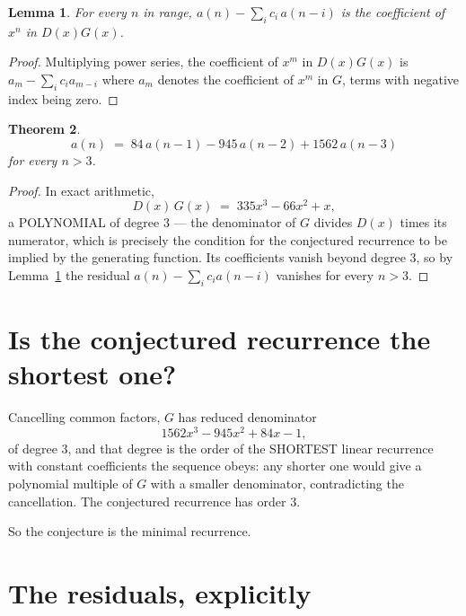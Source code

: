 \documentclass[11pt,a4paper]{article}
\theoremstyle{plain}
\newtheorem{theorem}{Theorem}
\newtheorem{lemma}[theorem]{Lemma}
\theoremstyle{definition}
\begin{document}
\begin{lemma}\label{lem:key}
For every $n$ in range, $a(n)-\sum_i c_i\,a(n-i)$ is the coefficient of $x^{n}$ in
$D(x)G(x)$.
\end{lemma}

\begin{proof}
Multiplying power series, the coefficient of $x^{m}$ in $D(x)G(x)$ is
$a_m-\sum_i c_i a_{m-i}$ where $a_m$ denotes the coefficient of $x^{m}$ in $G$, terms with
negative index being zero.
\end{proof}

\begin{theorem}
\[
a(n)\;=\;84\,a(n-1) - 945\,a(n-2) + 1562\,a(n-3)
\]
for every $n>3$.
\end{theorem}

\begin{proof}
In exact arithmetic,
\[
D(x)\,G(x)\;=\;335 x^{3} - 66 x^{2} + x,
\]
a POLYNOMIAL of degree $3$ --- the denominator of $G$ divides $D(x)$ times its numerator,
which is precisely the condition for the conjectured recurrence to be implied by the
generating function. Its coefficients vanish beyond degree $3$, so by
Lemma~\ref{lem:key} the residual $a(n)-\sum_ic_ia(n-i)$ vanishes for every
$n>3$.
\end{proof}

\section{Is the conjectured recurrence the shortest one?}

Cancelling common factors, $G$ has reduced denominator
\[
1562 x^{3} - 945 x^{2} + 84 x - 1,
\]
of degree $3$, and that degree is the order of the SHORTEST linear recurrence with
constant coefficients the sequence obeys: any shorter one would give a polynomial multiple of
$G$ with a smaller denominator, contradicting the cancellation. The conjectured recurrence has
order $3$.

So the conjecture is the minimal recurrence.

\section{The residuals, explicitly}
\end{document}

